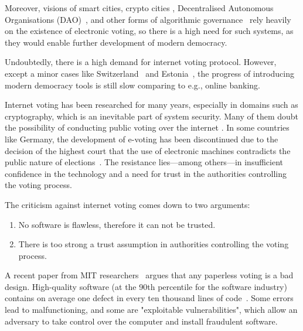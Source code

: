 \documentclass[runningheads]{llncs}
\begin{document}
Moreover, visions of smart cities, crypto cities \cite{buterinCryptoCities2021}, Decentralised Autonomous Organisations (DAO)~\cite{wangDecentralizedAutonomousOrganizations2019}, and other forms of algorithmic governance~\cite{GovernmentAlgorithm2022} rely heavily on the existence of electronic voting, so there is a high need for such systems, as they would enable further development of modern democracy.

Undoubtedly, there is a high demand for internet voting protocol. However, except a minor cases like Switzerland~\cite{ElectronicVotingSwitzerland2023} and Estonia~\cite{ElectronicVotingEstonia2023}, the progress of introducing modern democracy tools is still slow comparing to e.g., online banking.

Internet voting has been researched for many years, especially in domains such as cryptography, which is an inevitable part of system security. Many of them doubt the possibility of conducting public voting over the internet \cite{parkGoingBadWorse2021, mearianWhyBlockchainbasedVoting2019, shanklandNoBlockchainIsn2018, leeBlockchainbasedElectionsWould2018, schneierBlockchainVoting2020, schneierBlockchainTrust2019}. In some countries like Germany, the development of e-voting has been discontinued due to the decision of the highest court that the use of electronic machines contradicts the public nature of elections~\cite{ElectronicVotingCountry2023}. The resistance lies—among others—in insufficient confidence in the technology and a need for trust in the authorities controlling the voting process.

The criticism against internet voting comes down to two arguments:

\begin{enumerate}
    \item No software is flawless, therefore it can not be trusted.
    \item There is too strong a trust assumption in authorities controlling the voting process.
\end{enumerate}

A recent paper from MIT researchers~\cite{parkGoingBadWorse2021} argues that any paperless voting is a bad design. High-quality software (at the 90th percentile for the software industry) contains on average one defect in every ten thousand lines of code~\cite{llaguno2017CoverityScan2017}. Some errors lead to malfunctioning, and some are "exploitable vulnerabilities", which allow an adversary to take control over the computer and install fraudulent software.
\end{document}
